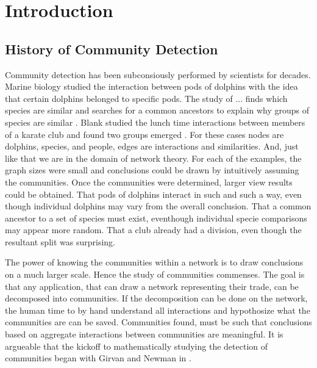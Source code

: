 \documentclass[phd,tocprelim]{cornell}
\begin{document}
\contentspage
\tablelistpage
\figurelistpage

\normalspacing \setcounter{page}{1} 
\pagestyle{cornell} \addtolength{\parskip}{0.5\baselineskip}

\chapter{Introduction}

\section{History of Community Detection}

Community detection has been subconsiously performed by scientists for decades.  Marine biology studied the interaction between pods of dolphins \cite{} with the idea that certain dolphins belonged to specific pods.  The study of ... finds which species are similar and searches for a common ancestors to explain why groups of species are similar \cite{}.  Blank studied the lunch time interactions between members of a karate club and found two groups emerged \cite{}.  For these cases nodes are dolphins, species, and people, edges are interactions and similarities.  And, just like that we are in the domain of network theory.  For each of the examples, the graph sizes were small and conclusions could be drawn by intuitively assuming the communities.  Once the communities were determined, larger view results could be obtained.  That pods of dolphins interact in such and such a way, even though individual dolphins may vary from the overall conclusion.  That a common ancestor to a set of species must exist, eventhough individual specie comparisons may appear more random.  That a club already had a division, even though the resultant split was surprising.

The power of knowing the communities within a network is to draw conclusions on a much larger scale.  Hence the study of communities commenses.  The goal is that any application, that can draw a network representing their trade, can be decomposed into communities.  If the decomposition can be done on the network, the human time to by hand understand all interactions and hypothosize what the communities are can be saved.  Communities found, must be such that conclusions based on aggregate interactions between communities are meaningful.  It is argueable that the kickoff to mathematically studying the detection of communities began with Girvan and Newman in \cite{girvan}.
\end{document}
